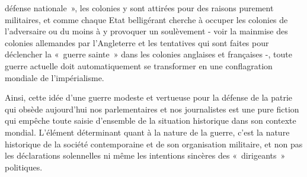\documentclass[french,twoside]{book} %
\begin{document}
défense nationale », les colonies y sont attirées pour des raisons purement militaires, et comme chaque Etat belligérant cherche à occuper les colonies de l’adversaire ou du moins à y provoquer un soulèvement - voir la mainmise des colonies allemandes par l’Angleterre et les tentatives qui sont faites pour déclencher la « guerre sainte » dans les colonies anglaises et françaises -, toute guerre actuelle doit automatiquement se transformer en une conflagration mondiale de l’impérialisme.\par
Ainsi, cette idée d’une guerre modeste et vertueuse pour la défense de la patrie qui obsède aujourd’hui nos parlementaires et nos journalistes est une pure fiction qui empêche toute saisie d’ensemble de la situation historique dans son contexte mondial. L'élément déterminant quant à la nature de la guerre, c’est la nature historique de la société contemporaine et de son organisation militaire, et non pas les déclarations solennelles ni même les intentions sincères des « dirigeants » politiques.\par
\end{document}
